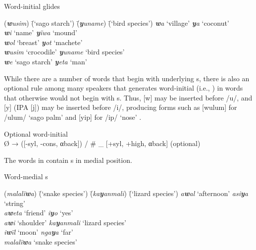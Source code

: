 \ea%
    \label{ex:phon:37}
          Word-initial glides\\
\begin{tabbing}
{(\textit{\textbf{w}usim})} \= {(‘sago starch’)} \= {(\textit{\textbf{y}uname})} \= {(‘bird species’)}\kill
{\textit{\textbf{w}a}} \> {‘village’} \> {\textit{\textbf{y}a}} \> {‘coconut’}\\
{\textit{\textbf{w}i}} \> {‘name’} \> {\textit{\textbf{y}ïwa}} \> {‘mound’}\\
{\textit{\textbf{w}ol}} \> {‘breast’} \> {\textit{\textbf{y}ot}} \> {‘machete’}\\
{\textit{\textbf{w}usim}} \> {‘crocodile’} \> {\textit{\textbf{y}uname}} \> {‘bird species’}\\
{\textit{\textbf{w}e}} \> {‘sago starch’} \> {\textit{\textbf{y}eta}} \> {‘man’}
\end{tabbing}
\z

While there are a number of words that begin with underlying s, there is also an optional rule among many speakers that generates word-initial   (i.e., ) in words that otherwise would not begin with s. Thus, [w] may be inserted before /u/, and [y] (IPA [j]) may be inserted before /i/, producing forms such as [wulum] for /ulum/ ‘sago palm’ and [yip] for /ip/ ‘nose’ .

\ea%
    \label{ex:phon:38}
          Optional word-initial  \\
    Ø → ([-syl, -cons, {αback])} / \# \_ [+syl, +high, {αback] (optional)}
\z

The words in  contain s in medial position.

\ea%
    \label{ex:phon:39}
          Word-medial s\\
\begin{tabbing}
{(\textit{malalï\textbf{w}a})} \= {(‘snake species’)} \= {(\textit{ka\textbf{y}anmali})} \= {(‘lizard species’)}\kill
{\textit{a\textbf{w}al}} \> {‘afternoon’} \> {\textit{asi\textbf{y}a}} \> {‘string’}\\
{\textit{a\textbf{w}eta}} \> {‘friend’} \> {\textit{i\textbf{y}o}} \> {‘yes’}\\
{\textit{a\textbf{w}i}} \> {‘shoulder’} \> {\textit{ka\textbf{y}anmali}} \> {‘lizard species’}\\
{\textit{i\textbf{w}ïl}} \> {‘moon’} \> {\textit{nga\textbf{y}a}} \> {‘far’}\\
{\textit{malalï\textbf{w}a}} \> {‘snake species’} \> { } \> { }
\end{tabbing}
\z

